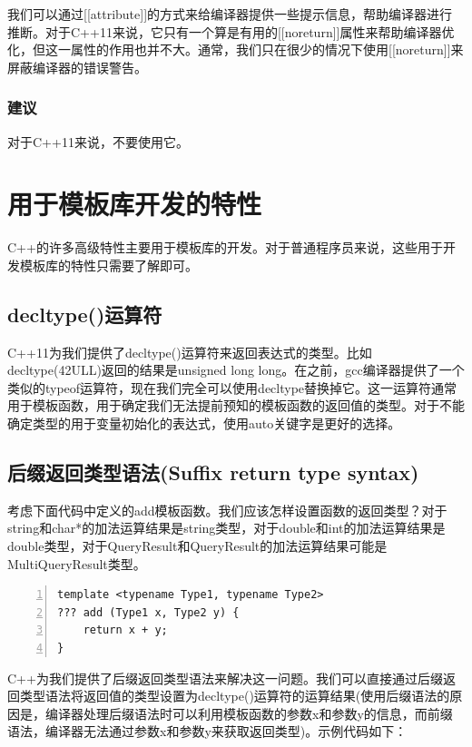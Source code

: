 \documentclass{ctexart}
\begin{document}
我们可以通过[[attribute]]的方式来给编译器提供一些提示信息，帮助编译器进行推断。对于C++11来说，它只有一个算是有用的[[noreturn]]属性来帮助编译器优化，但这一属性的作用也并不大。通常，我们只在很少的情况下使用[[noreturn]]来屏蔽编译器的错误警告。

\subsubsection*{建议}

对于C++11来说，不要使用它。

\newpage
\section{用于模板库开发的特性}

C++的许多高级特性主要用于模板库的开发。对于普通程序员来说，这些用于开发模板库的特性只需要了解即可。

\subsection{decltype()运算符}

C++11为我们提供了decltype()运算符来返回表达式的类型。比如 decltype(42ULL)返回的结果是unsigned long long。在之前，gcc编译器提供了一个类似的typeof运算符，现在我们完全可以使用decltype替换掉它。这一运算符通常用于模板函数，用于确定我们无法提前预知的模板函数的返回值的类型。对于不能确定类型的用于变量初始化的表达式，使用auto关键字是更好的选择。

\subsection{后缀返回类型语法(Suffix return type syntax)}

考虑下面代码中定义的add模板函数。我们应该怎样设置函数的返回类型？对于string和char*的加法运算结果是string类型，对于double和int的加法运算结果是double类型，对于QueryResult和QueryResult的加法运算结果可能是MultiQueryResult类型。

\begin{lstlisting}[language={[ANSI]C},keywordstyle=\color{blue!70},commentstyle=\color{red!50!green!50!blue!50},frame=shadowbox, rulesepcolor=\color{red!20!green!20!blue!20},basicstyle=\small,numbers=left, numberstyle=\tiny,breaklines=true]
template <typename Type1, typename Type2>  
??? add (Type1 x, Type2 y) {  
	return x + y;  
}
\end{lstlisting}

C++为我们提供了后缀返回类型语法来解决这一问题。我们可以直接通过后缀返回类型语法将返回值的类型设置为decltype()运算符的运算结果(使用后缀语法的原因是，编译器处理后缀语法时可以利用模板函数的参数x和参数y的信息，而前缀语法，编译器无法通过参数x和参数y来获取返回类型)。示例代码如下：
\end{document}
